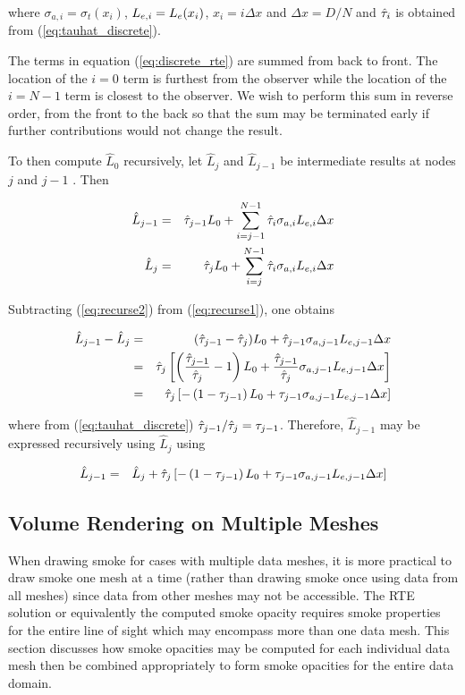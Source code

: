 where $\sigma_{a,i}=\sigma_t(x_i)$, $L_{e,i}=L_e(x_i)$, $x_i=i\Delta x$ and $\Delta x=D/N$ and $\hat{\tau}_{i}$ is obtained from (\ref{eq:tauhat_discrete}).


The terms in equation (\ref{eq:discrete_rte}) are summed from back to front.  The location of the $i=0$ term is furthest from the observer while the location of the $i=N-1$ term is closest to the observer.  We wish to perform this sum in reverse order, from the front to the back so that the sum may be terminated early if further contributions would not change the result. 

To then compute $\hat{L}_0$ recursively,
let $\hat{L}_j$ and $\hat{L}_{j-1}$ be intermediate results at nodes $j$ and $j-1$ .  Then

\begin{eqnarray}
\label{eq:recurse1}
\hat{L}_{j-1} &= &\hat{\tau}_{j-1}L_0 + \sum_{i=j-1}^{N-1}\hat{\tau}_{i}\sigma_{a,i}L_{e,i}\Delta x\\
\label{eq:recurse2}
\hat{L}_j     &= &\hat{\tau}_{j}  L_0 + \sum_{i=j}^{N-1}  \hat{\tau}_{i}\sigma_{a,i}L_{e,i}\Delta x
\end{eqnarray}

Subtracting (\ref{eq:recurse2}) from (\ref{eq:recurse1}), one obtains

\begin{eqnarray*}
\hat{L}_{j-1} -\hat{L}_{j}&= &(\hat{\tau}_{j-1}-\hat{\tau}_{j})L_0 + \hat{\tau}_{j-1}\sigma_{a,j-1}L_{e,j-1}\Delta x\\
                        &= &\hat{\tau}_{j}\left[\left(\frac{\hat{\tau}_{j-1}}{\hat{\tau}_{j}}-1\right)L_0 + \frac{\hat{\tau}_{j-1}}{\hat{\tau}_{j}}\sigma_{a,j-1}L_{e,j-1}\Delta x\right]\\
                        &= &\hat{\tau}_{j}\left[-\left(1-\tau_{j-1}\right)L_0 + \tau_{j-1}\sigma_{a,j-1}L_{e,j-1}\Delta x\right]
\end{eqnarray*}

where from (\ref{eq:tauhat_discrete}) $\hat{\tau}_{j-1}/\hat{\tau}_{j}=\tau_{j-1}$.  Therefore, $\hat{L}_{j-1}$ may be expressed recursively using $\hat{L}_{j}$ using

\begin{eqnarray}
\hat{L}_{j-1} &= &\hat{L}_{j}+\hat{\tau}_{j}\left[-\left(1-\tau_{j-1}\right)L_0 + \tau_{j-1}\sigma_{a,j-1}L_{e,j-1}\Delta x\right]
\end{eqnarray}

%
%

\subsection{Volume Rendering on Multiple Meshes}
When drawing smoke for cases with multiple data meshes, it is more practical to draw smoke one mesh at a time (rather than drawing smoke once using data from all meshes) since data from other meshes may not be accessible.  The RTE solution or equivalently the computed smoke opacity requires smoke properties for the entire line of sight which may encompass more than one data mesh.  This section discusses how smoke opacities may be computed for each individual data mesh then be combined appropriately to form smoke opacities for the entire data domain.

